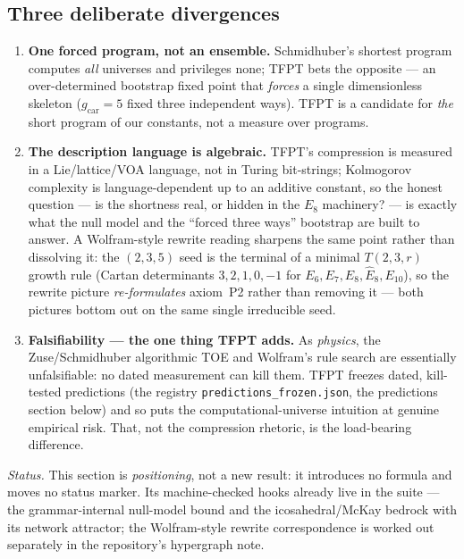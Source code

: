 \documentclass[11pt,a4paper]{article}
\begin{document}
\subsection*{Three deliberate divergences}
\begin{enumerate}[leftmargin=1.6em,itemsep=2pt,topsep=2pt,label=\textbf{(\Alph*)}]
\item \textbf{One forced program, not an ensemble.} Schmidhuber's shortest program
      computes \emph{all} universes and privileges none; TFPT bets the opposite --- an
      over-determined bootstrap fixed point that \emph{forces} a single dimensionless
      skeleton ($g_{\mathrm{car}}{=}5$ fixed three independent ways). TFPT is a candidate
      for \emph{the} short program of our constants, not a measure over programs.
\item \textbf{The description language is algebraic.} TFPT's compression is measured in a
      Lie/lattice/VOA language, not in Turing bit-strings; Kolmogorov complexity is
      language-dependent up to an additive constant, so the honest question --- is the
      shortness real, or hidden in the $E_8$ machinery? --- is exactly what the null model
      and the ``forced three ways'' bootstrap are built to answer. A Wolfram-style rewrite
      reading sharpens the same point rather than dissolving it: the $(2,3,5)$ seed is the
      terminal of a minimal $T(2,3,r)$ growth rule (Cartan determinants $3,2,1,0,-1$ for
      $E_6,E_7,E_8,\hat E_8,E_{10}$), so the rewrite picture \emph{re-formulates}
      axiom~P2 rather than removing it --- both pictures bottom out on the same single
      irreducible seed.
\item \textbf{Falsifiability --- the one thing TFPT adds.} As \emph{physics}, the
      Zuse/Schmidhuber algorithmic TOE and Wolfram's rule search are essentially
      unfalsifiable: no dated measurement can kill them. TFPT freezes dated, kill-tested
      predictions (the registry \texttt{predictions\_frozen.json}, the predictions section
      below) and so puts the computational-universe intuition at genuine empirical risk.
      That, not the compression rhetoric, is the load-bearing difference.
\end{enumerate}

\noindent\emph{Status.} This section is \emph{positioning}, not a new result: it
introduces no formula and moves no status marker. Its machine-checked hooks already live
in the suite --- the grammar-internal null-model bound and the icosahedral/McKay bedrock
with its network attractor; the Wolfram-style rewrite correspondence is worked out
separately in the repository's hypergraph note.
\end{document}
